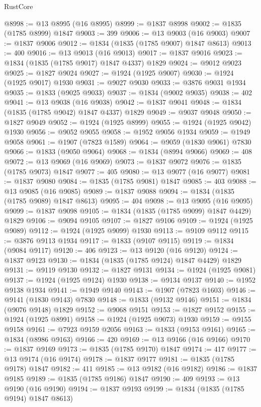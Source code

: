 \begin{lexlean}{RustCore}
\begin{coremodule}
@8998 := @13 @8995 (@16 @8995)
@8999 := @1837 @8998
@9002 := @1835 (@1785 @8999) @1847
@9003 := 399
@9006 := @13 @9003 (@16 @9003)
@9007 := @1837 @9006
@9012 := @1834 (@1835 (@1785 @9007) @1847 @8613)
@9013 := 400
@9016 := @13 @9013 (@16 @9013)
@9017 := @1837 @9016
@9023 := @1834 (@1835 (@1785 @9017) @1847 @4337) @1829
@9024 := @9012 @9023
@9025 := @1827 @9024
@9027 := @1924 (@1925 @9007)
@9030 := @1924 (@1925 @9017) @1930
@9031 := @9027 @9030
@9033 := @3876 @9031 @1934
@9035 := @1833 (@9025 @9033)
@9037 := @1834 (@9002 @9035)
@9038 := 402
@9041 := @13 @9038 (@16 @9038)
@9042 := @1837 @9041
@9048 := @1834 (@1835 (@1785 @9042) @1847 @4337) @1829
@9049 := @9037 @9048
@9050 := @1827 @9049
@9052 := @1924 (@1925 @8999)
@9055 := @1924 (@1925 @9042) @1930
@9056 := @9052 @9055
@9058 := @1952 @9056 @1934
@9059 := @1949 @9058
@9061 := @1907 (@7823 @1589)
@9064 := @9059 (@1830 @9061) @7830
@9066 := @1833 (@9050 @9064)
@9068 := @1834 (@8994 @9066)
@9069 := 408
@9072 := @13 @9069 (@16 @9069)
@9073 := @1837 @9072
@9076 := @1835 (@1785 @9073) @1847
@9077 := 405
@9080 := @13 @9077 (@16 @9077)
@9081 := @1837 @9080
@9084 := @1835 (@1785 @9081) @1847
@9085 := 403
@9088 := @13 @9085 (@16 @9085)
@9089 := @1837 @9088
@9094 := @1834 (@1835 (@1785 @9089) @1847 @8613)
@9095 := 404
@9098 := @13 @9095 (@16 @9095)
@9099 := @1837 @9098
@9105 := @1834 (@1835 (@1785 @9099) @1847 @4429) @1829
@9106 := @9094 @9105
@9107 := @1827 @9106
@9109 := @1924 (@1925 @9089)
@9112 := @1924 (@1925 @9099) @1930
@9113 := @9109 @9112
@9115 := @3876 @9113 @1934
@9117 := @1833 (@9107 @9115)
@9119 := @1834 (@9084 @9117)
@9120 := 406
@9123 := @13 @9120 (@16 @9120)
@9124 := @1837 @9123
@9130 := @1834 (@1835 (@1785 @9124) @1847 @4429) @1829
@9131 := @9119 @9130
@9132 := @1827 @9131
@9134 := @1924 (@1925 @9081)
@9137 := @1924 (@1925 @9124) @1930
@9138 := @9134 @9137
@9140 := @1952 @9138 @1934
@9141 := @1949 @9140
@9143 := @1907 (@7823 @1603)
@9146 := @9141 (@1830 @9143) @7830
@9148 := @1833 (@9132 @9146)
@9151 := @1834 (@9076 @9148) @1829
@9152 := @9068 @9151
@9153 := @1827 @9152
@9155 := @1924 (@1925 @8991)
@9158 := @1924 (@1925 @9073) @1930
@9159 := @9155 @9158
@9161 := @7923 @9159 @2056
@9163 := @1833 (@9153 @9161)
@9165 := @1834 (@8986 @9163)
@9166 := 420
@9169 := @13 @9166 (@16 @9166)
@9170 := @1837 @9169
@9173 := @1835 (@1785 @9170) @1847
@9174 := 417
@9177 := @13 @9174 (@16 @9174)
@9178 := @1837 @9177
@9181 := @1835 (@1785 @9178) @1847
@9182 := 411
@9185 := @13 @9182 (@16 @9182)
@9186 := @1837 @9185
@9189 := @1835 (@1785 @9186) @1847
@9190 := 409
@9193 := @13 @9190 (@16 @9190)
@9194 := @1837 @9193
@9199 := @1834 (@1835 (@1785 @9194) @1847 @8613)

\end{coremodule}
\end{lexlean}
